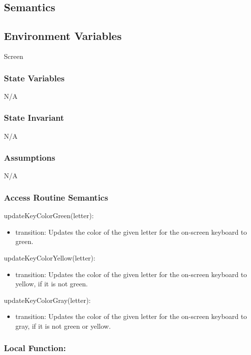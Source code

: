 \documentclass[12pt]{article}
\begin{document}
\subsection* {Semantics}

\subsection*{Environment Variables}

Screen

\subsubsection* {State Variables}
N/A

\subsubsection* {State Invariant}

N/A

\subsubsection* {Assumptions}

N/A

\subsubsection* {Access Routine Semantics}

\noindent updateKeyColorGreen(letter):
\begin{itemize}
  \item transition: Updates the color of the given letter for the on-screen keyboard to green.
\end{itemize}

\noindent updateKeyColorYellow(letter):
\begin{itemize}
  \item transition: Updates the color of the given letter for the on-screen keyboard to yellow, if it is not green.
\end{itemize}

\noindent updateKeyColorGray(letter):
\begin{itemize}
  \item transition: Updates the color of the given letter for the on-screen keyboard to gray, if it is not green or yellow.
\end{itemize}

\subsubsection*{Local Function:}
\end{document}
